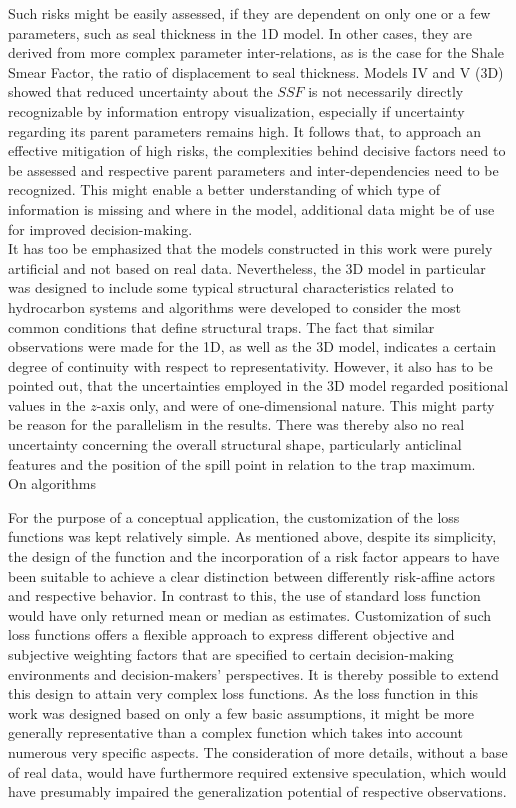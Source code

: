 	Such risks might be easily assessed, if they are dependent on only one or a few parameters, such as seal thickness in the 1D model. In other cases, they are derived from more complex parameter inter-relations, as is the case for the Shale Smear Factor, the ratio of displacement to seal thickness. Models IV and V (3D) showed that reduced uncertainty about the $SSF$ is not necessarily directly recognizable by information entropy visualization, especially if uncertainty regarding its parent parameters remains high. It follows that, to approach an effective mitigation of high risks, the complexities behind decisive factors need to be assessed and respective parent parameters and inter-dependencies need to be recognized. This might enable a better understanding of which type of information is missing and where in the model, additional data might be of use for improved decision-making.\\

	It has too be emphasized that the models constructed in this work were purely artificial and not based on real data. Nevertheless, the 3D model in particular was designed to include some typical structural characteristics related to hydrocarbon systems and algorithms were developed to consider the most common conditions that define structural traps. The fact that similar observations were made for the 1D, as well as the 3D model, indicates a certain degree of continuity with respect to representativity. However, it also has to be pointed out, that the uncertainties employed in the 3D model regarded positional values in the $z$-axis only, and were of one-dimensional nature. This might party be reason for the parallelism in the results. There was thereby also no real uncertainty concerning the overall structural shape, particularly anticlinal features and the position of the spill point in relation to the trap maximum.\\
	
	On algorithms
	
	For the purpose of a conceptual application, the customization of the loss functions was kept relatively simple. As mentioned above, despite its simplicity, the design of the function and the incorporation of a risk factor appears to have been suitable to achieve a clear distinction between differently risk-affine actors and respective behavior. In contrast to this, the use of standard loss function would have only returned mean or median as estimates. Customization of such loss functions offers a flexible approach to express different objective and subjective weighting factors that are specified to certain decision-making environments and decision-makers' perspectives. It is thereby possible to extend this design to attain very complex loss functions. As the loss function in this work was designed based on only a few basic assumptions, it might be more generally representative than a complex function which takes into account numerous very specific aspects. The consideration of more details, without a base of real data, would have furthermore required extensive speculation, which would have presumably impaired the generalization potential of respective observations.\\
	
